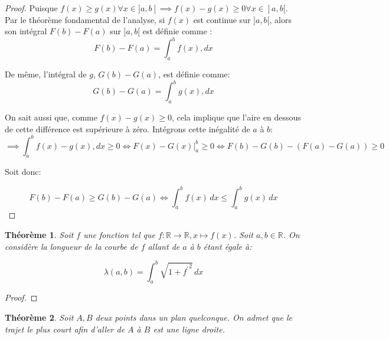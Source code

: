 \documentclass{amsart}
\newtheorem{theorem}{Théorème}[section]
\theoremstyle{definition}
\theoremstyle{remark}
\numberwithin{equation}{section}
\begin{document}
\begin{proof}
  Puisque $f(x)\geq g(x) \forall x\in]a,b[ \implies f(x)-g(x)\geq 0\forall x\in]a,b[ $. Par le théorème fondamental de l’analyse, si $f(x)$ est continue sur $]a,b[$, alors son intégral $F(b)-F(a)$ sur $]a,b[$ est définie comme : 
  \[F(b)-F(a) = \int_{a}^{b} f(x) , dx\]

  De même, l'intégral de $g$, $G(b)-G(a)$, est définie comme: \[G(b)-G(a) = \int_{a}^{b} g(x) , dx\]
  
  On sait aussi que, comme $f(x)-g(x)\geq0$, cela implique que l'aire en dessous de cette différence est supérieure à zéro. Intégrons cette inégalité de $a$ à $b$: \[\implies \int_{a}^{b} f(x) - g(x), dx \geq 0 \Leftrightarrow F(x)-G(x) \Biggr|_{a}^{b}\geq0 \Leftrightarrow F(b)-G(b) -(F(a)-G(a)) \geq 0 \]

  Soit donc:

  \[F(b)-F(a) \geq G(b)-G(a) \Leftrightarrow \int_{a}^{b}f(x) \,dx \le \int_{a}^{b}g(x) \,dx\]
\end{proof}

\begin{theorem}
  Soit $f$ une fonction tel que $f:\mathbb{R}\longrightarrow \mathbb{R}, x\longmapsto f(x)$. Soit $a,b\in\mathbb{R}$. On considère la longueur de la courbe de $f$ allant de $a$ à $b$ étant égale à:
  
  \[\lambda(a,b)=\int_{a}^{b} \sqrt{1+{f^\prime}^2} \,dx\]
\end{theorem}

\begin{proof}
  
\end{proof}

\begin{theorem}
  Soit $A,B$ deux points dans un plan quelconque. On admet que le trajet le plus court afin d'aller de $A$ à $B$ est une ligne droite.
\end{theorem}
\end{document}
